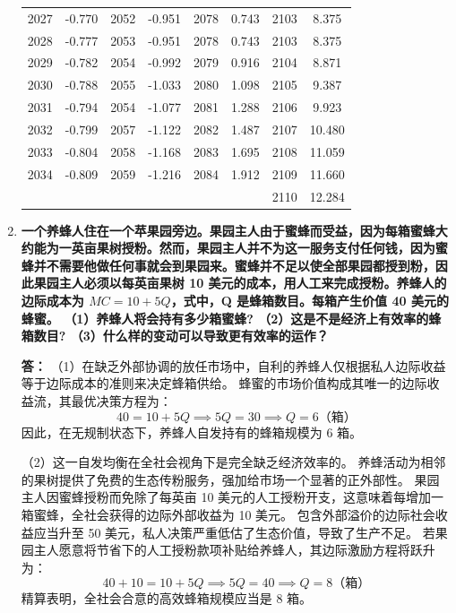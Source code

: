\begin{enumerate}[label=\textbf{\arabic*.}, leftmargin=*]
\begin{center}
\begin{tabular*}{\linewidth}{@{\extracolsep{\fill}}cccccccc}
				2027 & -0.770 & 2052 & -0.951 & 2078 & 0.743  & 2103 & 8.375  \\
				2028 & -0.777 & 2053 & -0.951 & 2078 & 0.743  & 2103 & 8.375  \\
				2029 & -0.782 & 2054 & -0.992 & 2079 & 0.916  & 2104 & 8.871  \\
				2030 & -0.788 & 2055 & -1.033 & 2080 & 1.098  & 2105 & 9.387  \\
				2031 & -0.794 & 2054 & -1.077 & 2081 & 1.288  & 2106 & 9.923  \\
				2032 & -0.799 & 2057 & -1.122 & 2082 & 1.487  & 2107 & 10.480 \\
				2033 & -0.804 & 2058 & -1.168 & 2083 & 1.695  & 2108 & 11.059 \\
				2034 & -0.809 & 2059 & -1.216 & 2084 & 1.912  & 2109 & 11.660 \\
				&        &      &        &      &        & 2110 & 12.284 \\ \hline
			\end{tabular*}
		\end{center}
		\newpage
		\item \textbf{一个养蜂人住在一个苹果园旁边。果园主人由于蜜蜂而受益，因为每箱蜜蜂大约能为一英亩果树授粉。然而，果园主人并不为这一服务支付任何钱，因为蜜蜂并不需要他做任何事就会到果园来。蜜蜂并不足以使全部果园都授到粉，因此果园主人必须以每英亩果树 10 美元的成本，用人工来完成授粉。养蜂人的边际成本为 $MC = 10 + 5Q$，式中，Q 是蜂箱数目。每箱产生价值 40 美元的蜂蜜。
			（1）养蜂人将会持有多少箱蜜蜂?
			（2）这是不是经济上有效率的蜂箱数目?
			（3）什么样的变动可以导致更有效率的运作？}
		
		\textbf{答：} （1）在缺乏外部协调的放任市场中，自利的养蜂人仅根据私人边际收益等于边际成本的准则来决定蜂箱供给。
		蜂蜜的市场价值构成其唯一的边际收益流，其最优决策方程为：
		\[
		40 = 10 + 5Q \implies 5Q = 30 \implies Q = 6 \text{（箱）}
		\]
		因此，在无规制状态下，养蜂人自发持有的蜂箱规模为 6 箱。
		
		（2）这一自发均衡在全社会视角下是完全缺乏经济效率的。
		养蜂活动为相邻的果树提供了免费的生态传粉服务，强加给市场一个显著的正外部性。
		果园主人因蜜蜂授粉而免除了每英亩 10 美元的人工授粉开支，这意味着每增加一箱蜜蜂，全社会获得的边际外部收益为 10 美元。
		包含外部溢价的边际社会收益应当升至 50 美元，私人决策严重低估了生态价值，导致了生产不足。
		若果园主人愿意将节省下的人工授粉款项补贴给养蜂人，其边际激励方程将跃升为：
		\[
		40 + 10 = 10 + 5Q \implies 5Q = 40 \implies Q = 8 \text{（箱）}
		\]
		精算表明，全社会合意的高效蜂箱规模应当是 8 箱。
		

\end{enumerate}
